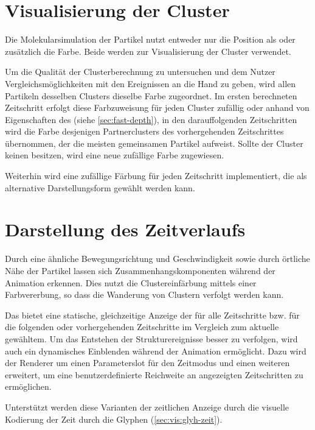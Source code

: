 \section{Visualisierung der Cluster}\label{sec:visualisierung:cluster}
Die  Molekularsimulation der Partikel nutzt entweder nur die Position als  oder zusätzlich die Farbe. Beide werden zur Visualisierung der Cluster verwendet.

Um die Qualität der Clusterberechnung zu untersuchen und dem Nutzer Vergleichsmöglichkeiten mit den Ereignissen an die Hand zu geben, wird allen Partikeln desselben Clusters dieselbe Farbe zugeordnet. Im ersten berechneten Zeitschritt erfolgt diese Farbzuweisung für jeden Cluster zufällig oder anhand von Eigenschaften des  (siehe \autoref{sec:fast-depth}), in den darauffolgenden Zeitschritten wird die Farbe desjenigen Partnerclusters des vorhergehenden Zeitschrittes übernommen, der die meisten gemeinsamen Partikel aufweist. Sollte der Cluster keinen  besitzen, wird eine neue zufällige Farbe zugewiesen.

Weiterhin wird eine zufällige Färbung für jeden Zeitschritt implementiert, die als alternative Darstellungsform gewählt werden kann.

\section{Darstellung des Zeitverlaufs}
Durch eine ähnliche Bewegungsrichtung und Geschwindigkeit sowie durch örtliche Nähe der Partikel lassen sich Zusammenhangskomponenten während der Animation erkennen. Dies nutzt die Clustereinfärbung mittels einer Farbvererbung, so dass die Wanderung von Clustern verfolgt werden kann.

Das  bietet eine statische, gleichzeitige Anzeige der  für alle Zeitschritte bzw. für die folgenden oder vorhergehenden Zeitschritte im Vergleich zum aktuelle gewähltem. Um das Entstehen der Strukturereignisse besser zu verfolgen, wird auch ein dynamisches Einblenden während der Animation ermöglicht.
Dazu wird der Renderer um einen Parameterslot für den Zeitmodus und einen weiteren erweitert, um eine benutzerdefinierte Reichweite an angezeigten Zeitschritten zu ermöglichen.

Unterstützt werden diese Varianten der zeitlichen Anzeige durch die visuelle Kodierung der Zeit durch die Glyphen (\autoref{sec:vis:glyh-zeit}).




